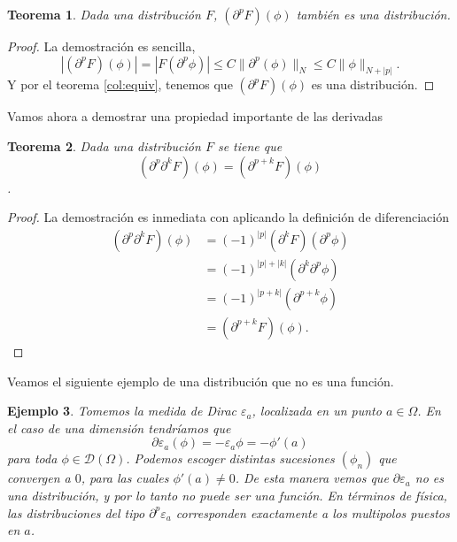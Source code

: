 \documentclass[letter,12pt]{article}
\newcommand\norm[1]{\lVert#1\rVert}
\newtheorem{theorem}{Teorema}
\newtheorem{example}[theorem]{Ejemplo}
\begin{document}
\begin{theorem}\normalfont
	Dada una distribución $ F $, $ (\partial^p F)(\phi)  $ también es una distribución.
\end{theorem}
\begin{proof}
	La demostración es sencilla,  
	\begin{equation*}
		|(\partial^p F)(\phi) | = |F(\partial^p{\phi})| \leq C \norm{\partial^p(\phi)}_N
			\leq  C \norm{\phi}_{N + |p|}.
	\end{equation*}
Y por el teorema \ref{col:equiv}, tenemos que $ (\partial^p F)(\phi) $ es una
distribución.
\end{proof}
Vamos ahora a demostrar una propiedad importante de las derivadas
\begin{theorem}\normalfont
	Dada una distribución $ F $ se tiene que 
	\[ (\partial^p \partial^k F)(\phi) = (\partial^{p+k} F)(\phi) \]. 
\end{theorem}
\begin{proof}
	La demostración es inmediata con aplicando la definición de diferenciación
	\begin{equation*}
		\begin{split}
			(\partial^p \partial^k F)(\phi) &= (-1)^{|p|}(\partial^k F)(\partial^p\phi) \\
			& = (-1)^{|p| + |k|}(\partial^k \partial^p\phi) \\
			& = (-1)^{|p + k|}(\partial^{p+k}\phi) \\
			& = (\partial^{p+k}F)(\phi).
		\end{split}
	\end{equation*}
\end{proof}

Veamos el siguiente ejemplo de una distribución que no es una función.

\begin{example}\normalfont
	Tomemos la medida de Dirac $ \varepsilon_a $, localizada en un punto $ a \in \Omega $.
	En el caso de una dimensión tendríamos que
	\[ \partial \varepsilon_a(\phi) = - \varepsilon_a{\phi} = - \phi'(a) \]
	para toda $ \phi \in \mathscr{D}(\Omega) $. Podemos escoger distintas sucesiones
	$ (\phi_n) $ que convergen a $ 0 $, para las cuales $ \phi'(a) \neq 0 $.
	De esta manera vemos que $ \partial \varepsilon_a $ no es una distribución, 
	y por lo tanto no puede ser una función. En términos de física, las distribuciones
	del tipo $ \partial^{p}\varepsilon_a  $ corresponden exactamente a los
	multipolos puestos en $ a $.
\end{example}
\end{document}
